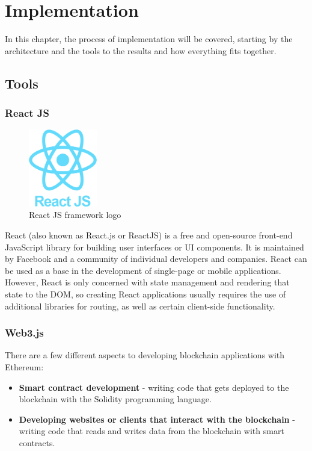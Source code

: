 \chapter{Implementation}

In this chapter, the process of implementation will be covered, starting by the architecture and the tools to the results and how everything fits together.

\section{Tools}
\subsection{React JS}

\begin{figure}
	\vspace{-10pt}
	\includegraphics[width=3cm]{images/chapter3/logo-react-js.png}
	\vspace{-10pt}
	\caption{{\footnotesize React JS framework logo}}
\end{figure}

React (also known as React.js or ReactJS) is a free and open-source front-end JavaScript library\cite{reactcommunityReactJavaScriptLibrary} for building user interfaces or UI components. It is maintained by Facebook and a community of individual developers and companies.\cite{krillReactMakingFaster2014} React can be used as a base in the development of single-page or mobile applications. However, React is only concerned with state management and rendering that state to the DOM, so creating React applications usually requires the use of additional libraries for routing, as well as certain client-side functionality.

\subsection{Web3.js}

There are a few different aspects to developing blockchain applications with Ethereum:

\begin{itemize}
\item \textbf{Smart contract development} - writing code that gets deployed to the blockchain with the Solidity programming language.
\item \textbf{Developing websites or clients that interact with the blockchain} - writing code that reads and writes data from the blockchain with smart contracts.
\end{itemize}

